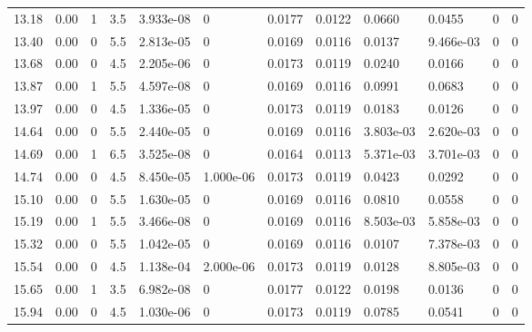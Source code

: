 \documentclass[preview]{standalone}
\begin{document}
{{\begin{tabular}{L{1.2cm}C{1.2cm} C{0.3cm}C{0.5cm} C{1.4cm}C{1.4cm} C{1.4cm}C{1.4cm} C{1.6cm}C{1.6cm} C{1.6cm}C{1.6cm}}
  13.18  &  0.00  & 1     & 3.5 &  3.933e-08  & 0  &  0.0177&   0.0122& 0.0660 & 0.0455   &  0 & 0  \\ 
  13.40  &  0.00  & 0     & 5.5 &  2.813e-05  & 0  &  0.0169&   0.0116& 0.0137 & 9.466e-03   &  0 & 0  \\ 
  13.68  &  0.00  & 0     & 4.5 &  2.205e-06  & 0  &  0.0173&   0.0119& 0.0240 & 0.0166   &  0 & 0  \\ 
  13.87  &  0.00  & 1     & 5.5 &  4.597e-08  & 0  &  0.0169&   0.0116& 0.0991 & 0.0683   &  0 & 0  \\ 
  13.97  &  0.00  & 0     & 4.5 &  1.336e-05  & 0  &  0.0173&   0.0119& 0.0183 & 0.0126   &  0 & 0  \\ 
  14.64  &  0.00  & 0     & 5.5 &  2.440e-05  & 0  &  0.0169&   0.0116& 3.803e-03 & 2.620e-03   &  0 & 0  \\ 
  14.69  &  0.00  & 1     & 6.5 &  3.525e-08  & 0  &  0.0164&   0.0113& 5.371e-03 & 3.701e-03   &  0 & 0  \\ 
  14.74  &  0.00  & 0     & 4.5 &  8.450e-05  & 1.000e-06  &  0.0173&   0.0119& 0.0423 & 0.0292   &  0 & 0  \\ 
  15.10  &  0.00  & 0     & 5.5 &  1.630e-05  & 0  &  0.0169&   0.0116& 0.0810 & 0.0558   &  0 & 0  \\ 
  15.19  &  0.00  & 1     & 5.5 &  3.466e-08  & 0  &  0.0169&   0.0116& 8.503e-03 & 5.858e-03   &  0 & 0  \\ 
  15.32  &  0.00  & 0     & 5.5 &  1.042e-05  & 0  &  0.0169&   0.0116& 0.0107 & 7.378e-03   &  0 & 0  \\ 
  15.54  &  0.00  & 0     & 4.5 &  1.138e-04  & 2.000e-06  &  0.0173&   0.0119& 0.0128 & 8.805e-03   &  0 & 0  \\ 
  15.65  &  0.00  & 1     & 3.5 &  6.982e-08  & 0  &  0.0177&   0.0122& 0.0198 & 0.0136   &  0 & 0  \\ 
  15.94  &  0.00  & 0     & 4.5 &  1.030e-06  & 0  &  0.0173&   0.0119& 0.0785 & 0.0541   &  0 & 0  \\ 
\hline 
\end{tabular} 

}}
\end{document}
